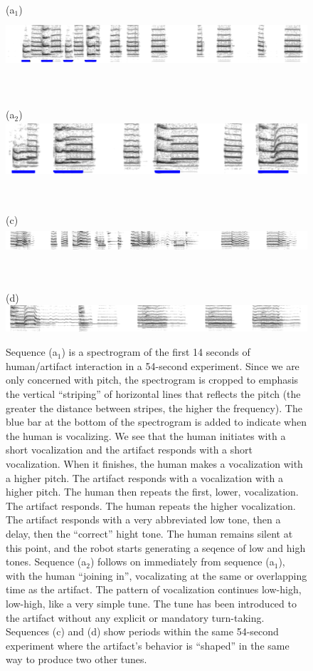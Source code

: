\begin{figure}[p]

\centerline{(a$_1$) \includegraphics[height=2cm]{images/chico-separate-begin-labelled}}

\ \\

\centerline{(a$_2$) \includegraphics[height=2cm]{images/chico-separate-together-labelled}}

\ \\

\centerline{(c) \includegraphics[height=1cm]{images/chico-pair}}

\ \\

\centerline{(d) \includegraphics[height=1cm]{images/chico-ohm}}


\caption{
%
Sequence (a$_1$) is a spectrogram of the first 14 seconds of human/artifact 
interaction in a 54-second experiment. 
Since we are only concerned with pitch, the 
spectrogram is cropped to emphasis the vertical ``striping'' of 
horizontal lines that reflects the pitch (the greater 
the distance between stripes, the higher the frequency).
The blue bar at the bottom of the spectrogram is added to 
indicate when the human is vocalizing.
%
We see that the human initiates with a short vocalization
and the artifact responds with a short vocalization.  When it
finishes, the human makes a vocalization with a higher pitch.
The artifact responds with a vocalization with a higher pitch.
The human then repeats the first, lower, vocalization.
The artifact responds.  The human repeats the higher vocalization.
The artifact responds with a very abbreviated low tone, then a delay,
then the ``correct'' hight tone.  The human remains silent at this
point, and the robot starts generating a seqence of low and high
tones.
%
Sequence (a$_2$) follows on immediately from sequence (a$_1$), with 
the human ``joining in'', vocalizating at the same or overlapping time 
as the artifact.  The pattern of vocalization continues low-high,
low-high, like a very simple tune.
%
The tune has been introduced to the artifact without any
explicit or mandatory turn-taking.
%
Sequences (c) and (d) show periods within the same 54-second experiment
where the artifact's behavior is ``shaped'' in the same way
to produce two other tunes.
}

\end{figure}
